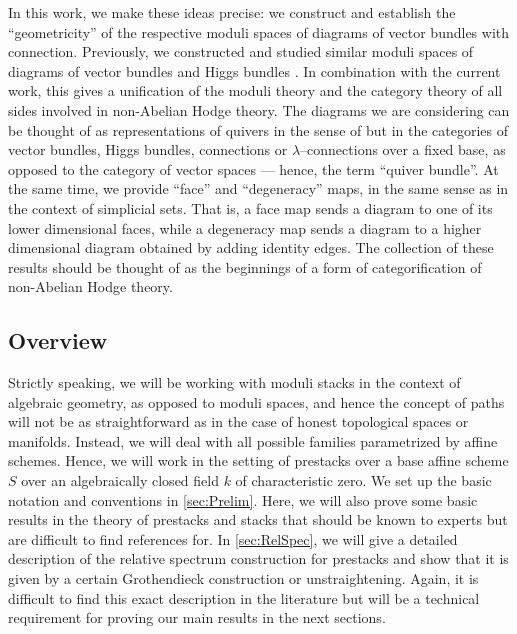 \documentclass[11pt]{amsart}
\begin{document}
In this work, we make these ideas precise: we construct and establish
the ``geometricity'' of the respective moduli spaces of diagrams of vector
bundles with connection. Previously, we constructed and studied similar moduli
spaces of diagrams of vector bundles and Higgs bundles \cite{ModQuivBun}.
In combination with the current work, this gives a unification of the moduli
theory and the category theory of all sides involved in non-Abelian Hodge
theory.
The diagrams we are considering can be thought of as representations of quivers
in the sense of \cite{QuivRepKirillov} but in the categories of vector bundles,
Higgs bundles, connections or $\lambda$--connections over a fixed base,
as opposed to the category of vector spaces --- hence, the term ``quiver
bundle''.
At the same time, we provide ``face'' and ``degeneracy'' maps, in the same sense
as in the context of simplicial sets. That is, a face map sends a diagram to one
of its lower dimensional faces, while a degeneracy map sends a diagram to a
higher dimensional diagram obtained by adding identity edges. The collection
of these results should be thought of as the beginnings of a form of
categorification of non-Abelian Hodge theory.

\subsection{Overview}

Strictly speaking, we will be working with moduli stacks in the context of
algebraic geometry, as opposed to moduli spaces, and hence the concept of paths
will not be as straightforward as in the case of honest topological spaces or
manifolds. Instead, we will deal with all possible families  parametrized by
affine schemes.  Hence, we will work in the setting of prestacks over a base
affine scheme $S$ over an algebraically closed field $k$ of characteristic zero.
We set up the basic notation and conventions in \cref{sec:Prelim}. Here, we will
also prove some basic results in the theory of prestacks and stacks that should
be known to experts but are difficult to find references for. In
\cref{sec:RelSpec}, we will give a detailed description of the relative spectrum
construction for prestacks and show that it is given by a certain Grothendieck
construction or unstraightening. Again, it is difficult to find this exact
description in the literature but will be a technical requirement for proving
our main results in the next sections.
\end{document}
